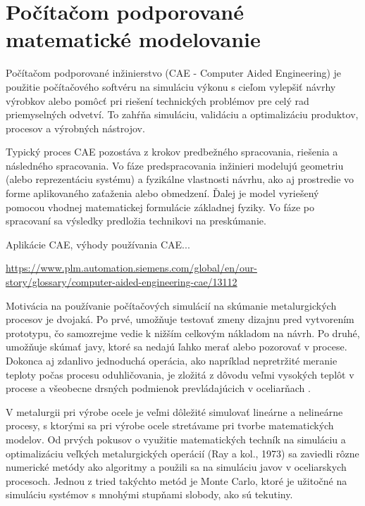 \documentclass[]{tukediphc}
\begin{document}

\section{Počítačom podporované matematické modelovanie}

Počítačom podporované inžinierstvo (CAE - Computer Aided Engineering) je použitie počítačového softvéru na simuláciu výkonu s cieľom vylepšiť návrhy výrobkov alebo pomôcť pri riešení technických problémov pre celý rad priemyselných odvetví. To zahŕňa simuláciu, validáciu a optimalizáciu produktov, procesov a výrobných nástrojov.

Typický proces CAE pozostáva z krokov predbežného spracovania, riešenia a následného spracovania. Vo fáze predspracovania inžinieri modelujú geometriu (alebo reprezentáciu systému) a fyzikálne vlastnosti návrhu, ako aj prostredie vo forme aplikovaného zaťaženia alebo obmedzení. Ďalej je model vyriešený pomocou vhodnej matematickej formulácie základnej fyziky. Vo fáze po spracovaní sa výsledky predložia technikovi na preskúmanie.

Aplikácie CAE, výhody používania CAE...

\url{https://www.plm.automation.siemens.com/global/en/our-story/glossary/computer-aided-engineering-cae/13112}

Motivácia na používanie počítačových simulácií na skúmanie metalurgických procesov je dvojaká. Po prvé, umožňuje testovať zmeny dizajnu pred vytvorením prototypu, čo samozrejme vedie k nižším celkovým nákladom na návrh. Po druhé, umožňuje skúmať javy, ktoré sa nedajú ľahko merať alebo pozorovať v procese. Dokonca aj zdanlivo jednoduchá operácia, ako napríklad nepretržité meranie teploty počas procesu oduhličovania, je zložitá z dôvodu veľmi vysokých teplôt v procese a všeobecne drsných podmienok prevládajúcich v oceliarňach \citep{Ersson2018}.




V metalurgii pri výrobe ocele je veľmi dôležité simulovať lineárne a nelineárne procesy, s ktorými sa pri výrobe ocele stretávame pri tvorbe matematických modelov. Od prvých pokusov o využitie matematických techník na simuláciu a optimalizáciu veľkých metalurgických operácií (Ray a kol., 1973) sa zaviedli rôzne numerické metódy ako algoritmy a použili sa na simuláciu javov v oceliarskych procesoch. Jednou z tried takýchto metód je Monte Carlo, ktoré je užitočné na simuláciu systémov s mnohými stupňami slobody, ako sú tekutiny.
\end{document}

